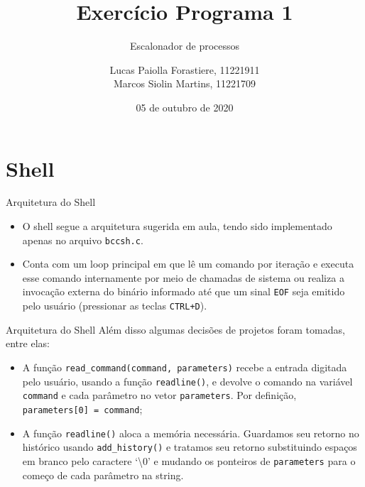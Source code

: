 \documentclass[10pt]{beamer}
\title{Exercício Programa 1}
\subtitle{Escalonador de processos}
\institute{IME-USP}
\author{Lucas Paiolla Forastiere, 11221911\\ Marcos Siolin Martins, 11221709}
\date{05 de outubro de 2020}
\begin{document}
    \maketitle
    \section{Shell}
    \begin{frame}{Arquitetura do Shell}
        \begin{itemize}
            \justifying
            \item O shell segue a arquitetura sugerida em aula, tendo sido implementado apenas no arquivo \texttt{bccsh.c}.

            \item Conta com um loop principal em que lê um comando por iteração e executa esse comando internamente por meio de chamadas de sistema ou realiza a invocação externa do binário informado até que um sinal \texttt{EOF} seja emitido pelo usuário (pressionar as teclas \texttt{CTRL+D}).
        \end{itemize}
    \end{frame}
    \begin{frame}{Arquitetura do Shell}
      Além disso algumas decisões de projetos foram tomadas, entre elas:
      \begin{itemize}
        \justifying
        \item A função \texttt{read\_command(command, parameters)} recebe a entrada digitada pelo usuário, usando a função \texttt{readline()}, e devolve o comando na variável \texttt{command} e cada parâmetro no vetor \texttt{parameters}. Por definição, \texttt{parameters[0] = command};
        \item A função \texttt{readline()} aloca a memória necessária. Guardamos seu retorno no histórico usando \texttt{add\_history()} e tratamos seu retorno substituindo espaços em branco pelo caractere `\textbackslash 0' e mudando os ponteiros de \texttt{parameters} para o começo de cada parâmetro na string.
      \end{itemize}
    \end{frame}
\end{document}
